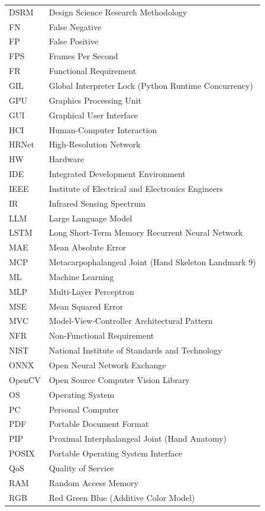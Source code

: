 {\begin{longtable}{@{}p{3.0cm} p{12.0cm}@{}}
DSRM & Design Science Research Methodology \\
FN & False Negative \\
FP & False Positive \\
FPS & Frames Per Second \\
FR & Functional Requirement \\
GIL & Global Interpreter Lock (Python Runtime Concurrency) \\
GPU & Graphics Processing Unit \\
GUI & Graphical User Interface \\
HCI & Human-Computer Interaction \\
HRNet & High-Resolution Network \\
HW & Hardware \\
IDE & Integrated Development Environment \\
IEEE & Institute of Electrical and Electronics Engineers \\
IR & Infrared Sensing Spectrum \\
LLM & Large Language Model \\
LSTM & Long Short-Term Memory Recurrent Neural Network \\
MAE & Mean Absolute Error \\
MCP & Metacarpophalangeal Joint (Hand Skeleton Landmark 9) \\
ML & Machine Learning \\
MLP & Multi-Layer Perceptron \\
MSE & Mean Squared Error \\
MVC & Model-View-Controller Architectural Pattern \\
NFR & Non-Functional Requirement \\
NIST & National Institute of Standards and Technology \\
ONNX & Open Neural Network Exchange \\
OpenCV & Open Source Computer Vision Library \\
OS & Operating System \\
PC & Personal Computer \\
PDF & Portable Document Format \\
PIP & Proximal Interphalangeal Joint (Hand Anatomy) \\
POSIX & Portable Operating System Interface \\
QoS & Quality of Service \\
RAM & Random Access Memory \\
RGB & Red Green Blue (Additive Color Model) \\

\end{longtable}}
